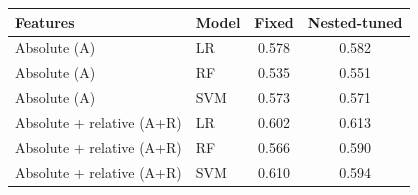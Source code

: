 \begin{tabular}{@{}llcc@{}}
\toprule
Features & Model & Fixed & Nested-tuned \\
\midrule
Absolute (A) & LR & 0.578 & 0.582 \\
Absolute (A) & RF & 0.535 & 0.551 \\
Absolute (A) & SVM & 0.573 & 0.571 \\
Absolute + relative (A+R) & LR & 0.602 & 0.613 \\
Absolute + relative (A+R) & RF & 0.566 & 0.590 \\
Absolute + relative (A+R) & SVM & 0.610 & 0.594 \\
\bottomrule
\end{tabular}
